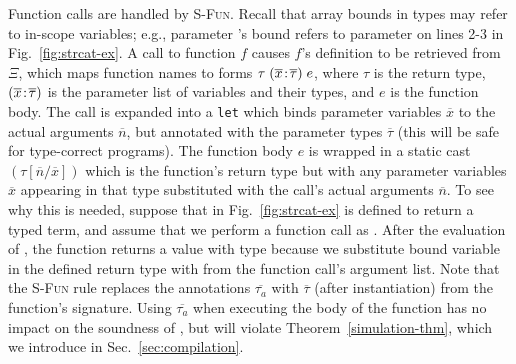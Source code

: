 Function calls are handled by \textsc{S-Fun}. Recall that array
bounds in types may refer to in-scope variables; e.g., parameter
's bound  refers to parameter  on lines
2-3 in Fig.~\ref{fig:strcat-ex}. A call to function $f$ causes $f$'s
definition to be retrieved from $\Xi$,
which maps function names to
forms $\tau\;({\overline{x}}\!:\!{\overline{\tau}})\;e$, where
$\tau$ is the return type, $({\overline{x}}\!:\!{\overline{\tau}})$
is the parameter list of variables and their types, and $e$ is the
function body. The call is expanded into a \texttt{let} which binds
parameter variables $\overline{x}$ to the actual arguments
$\overline{n}$, but annotated with the parameter types
$\overline{\tau}$ (this will be safe for type-correct programs). The
function body $e$ is wrapped in a static cast
$(\tau[\overline{n} / \overline{x}])$ which is the function's return
type but with any parameter variables $\overline{x}$ appearing in that
type substituted with the call's actual arguments $\overline{n}$. To
see why this is needed, suppose that  in
Fig.~\ref{fig:strcat-ex} is defined to return a
 typed term, and assume that we
perform a  function call as
. After the evaluation of , the
function returns a value with type 
because we substitute bound variable  in the 
defined return type with  from the function call's
argument list.
Note that the \textsc{S-Fun} rule replaces the
  annotations $\overline{\tau_a}$ with
  $\overline{\tau}$ (after instantiation) from the function's
  signature. Using $\overline{\tau_a}$ when executing the body of
the function has no impact on the soundness of \lang, but will violate
Theorem~\ref{simulation-thm}, which we introduce in Sec.~\ref{sec:compilation}.

